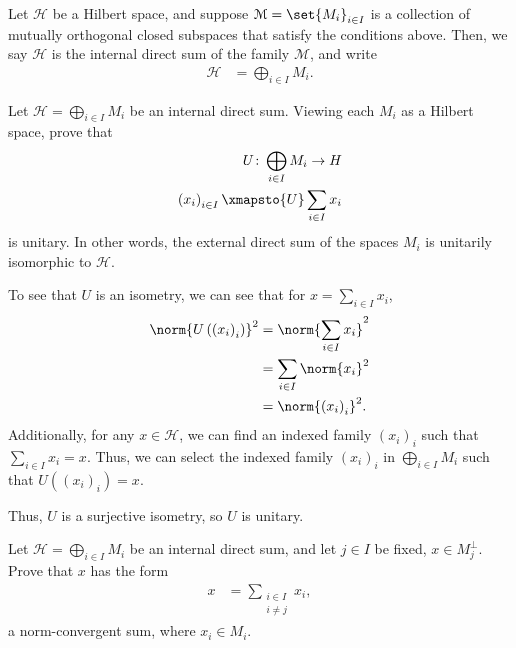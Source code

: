 \documentclass[10pt]{mypackage}
\begin{document}
\begin{definition}
  Let $\mathcal{H}$ be a Hilbert space, and suppose $\mathcal{M} = \set{M_i}_{i\in I}$ is a collection of mutually orthogonal closed subspaces that satisfy the conditions above. Then, we say $\mathcal{H}$ is the internal direct sum of the family $\mathcal{M}$, and write
  \begin{align*}
    \mathcal{H} &= \bigoplus_{i\in I}M_i.
  \end{align*}
\end{definition}
\begin{exercise}
  Let $\mathcal{H} = \bigoplus_{i\in I}M_i$ be an internal direct sum. Viewing each $M_i$ as a Hilbert space, prove that
  \begin{align*}
    U\colon \bigoplus_{i\in I}M_i \rightarrow H\\
    \left(x_i\right)_{i\in I} \xmapsto{U} \sum_{i\in I}x_i
  \end{align*}
  is unitary. In other words, the external direct sum of the spaces $M_i$ is unitarily isomorphic to $\mathcal{H}$.
\end{exercise}
\begin{solution}
  To see that $U$ is an isometry, we can see that for $x = \sum_{i\in I}x_i$,
  \begin{align*} 
    \norm{U\left(\left(x_i\right)_i\right)}^2 &= \norm{\sum_{i\in I}x_i}^2\\
                                              &= \sum_{i\in I} \norm{x_i}^2\\
                                              &= \norm{\left(x_i\right)_i}^2.
  \end{align*}
  Additionally, for any $x\in \mathcal{H}$, we can find an indexed family $\left(x_i\right)_i$ such that $\sum_{i\in I}x_i = x$. Thus, we can select the indexed family $\left(x_i\right)_i$ in $\bigoplus_{i\in I}M_i$ such that $U\left(\left(x_i\right)_i\right) = x$.\newline

  Thus, $U$ is a surjective isometry, so $U$ is unitary.
\end{solution}
\begin{exercise}
  Let $\mathcal{H} = \bigoplus_{i\in I}M_i$ be an internal direct sum, and let $j\in I$ be fixed, $x\in M_j^{\perp}$. Prove that $x$ has the form
  \begin{align*}
    x &= \sum_{\substack{i\in I\\i\neq j}}x_i,
  \end{align*}
  a norm-convergent sum, where $x_i \in M_i$.
\end{exercise}
\end{document}
